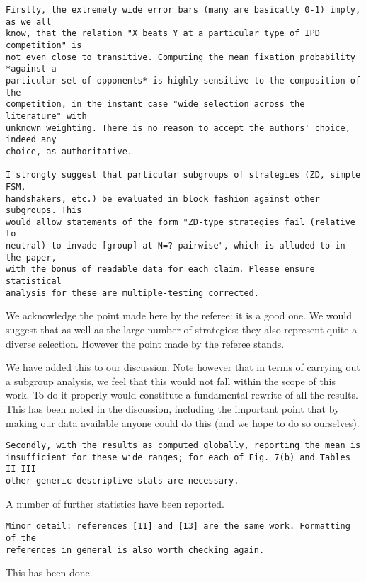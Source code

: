 \documentclass[a4]{article}
\begin{document}
\begin{verbatim}
Firstly, the extremely wide error bars (many are basically 0-1) imply, as we all
know, that the relation "X beats Y at a particular type of IPD competition" is
not even close to transitive. Computing the mean fixation probability *against a
particular set of opponents* is highly sensitive to the composition of the
competition, in the instant case "wide selection across the literature" with
unknown weighting. There is no reason to accept the authors' choice, indeed any
choice, as authoritative.

I strongly suggest that particular subgroups of strategies (ZD, simple FSM,
handshakers, etc.) be evaluated in block fashion against other subgroups. This
would allow statements of the form "ZD-type strategies fail (relative to
neutral) to invade [group] at N=? pairwise", which is alluded to in the paper,
with the bonus of readable data for each claim. Please ensure statistical
analysis for these are multiple-testing corrected.
\end{verbatim}

We acknowledge the point made here by the referee: it is a good one. We would
suggest that as well as the large number of strategies: they also represent quite
a diverse selection. However the point made by the referee stands. 

We have
added this to our discussion. Note however that in terms of carrying
out a subgroup analysis, we feel that this would not fall within the scope of
this work. To do it properly would constitute a fundamental rewrite of all the
results. This has been noted in the discussion, including the important point
that by making our data available anyone could do this (and we hope to do so
ourselves).

\begin{verbatim}
Secondly, with the results as computed globally, reporting the mean is
insufficient for these wide ranges; for each of Fig. 7(b) and Tables II-III
other generic descriptive stats are necessary.
\end{verbatim}

A number of further statistics have been reported.

\begin{verbatim}
Minor detail: references [11] and [13] are the same work. Formatting of the
references in general is also worth checking again.
\end{verbatim}

This has been done.
\end{document}
